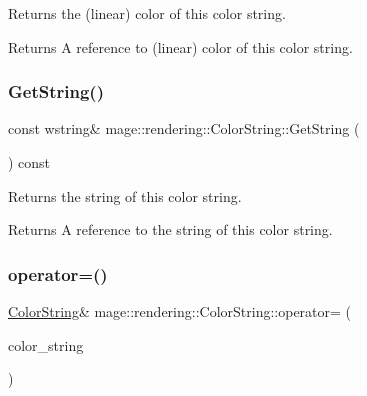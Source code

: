 Returns the (linear) color of this color string.

\begin{DoxyReturn}{Returns}
A reference to (linear) color of this color string. 
\end{DoxyReturn}
\hypertarget{classmage_1_1rendering_1_1_color_string_a146cf063553b65b3cd854417b638b533}{}\label{classmage_1_1rendering_1_1_color_string_a146cf063553b65b3cd854417b638b533} 
\subsubsection{\texorpdfstring{Get\+String()}{GetString()}}
{\footnotesize\ttfamily const wstring\& mage\+::rendering\+::\+Color\+String\+::\+Get\+String (\begin{DoxyParamCaption}{ }\end{DoxyParamCaption}) const\hspace{0.3cm}{\ttfamily [noexcept]}}

Returns the string of this color string.

\begin{DoxyReturn}{Returns}
A reference to the string of this color string. 
\end{DoxyReturn}
\hypertarget{classmage_1_1rendering_1_1_color_string_ab42304d36628f21263a4d545831b3829}{}\label{classmage_1_1rendering_1_1_color_string_ab42304d36628f21263a4d545831b3829} 
\subsubsection{\texorpdfstring{operator=()}{operator=()}\hspace{0.1cm}{\footnotesize\ttfamily [1/2]}}
{\footnotesize\ttfamily \hyperlink{classmage_1_1rendering_1_1_color_string}{Color\+String}\& mage\+::rendering\+::\+Color\+String\+::operator= (\begin{DoxyParamCaption}\item[{const \hyperlink{classmage_1_1rendering_1_1_color_string}{Color\+String} \&}]{color\+\_\+string }\end{DoxyParamCaption})\hspace{0.3cm}{\ttfamily [default]}}

